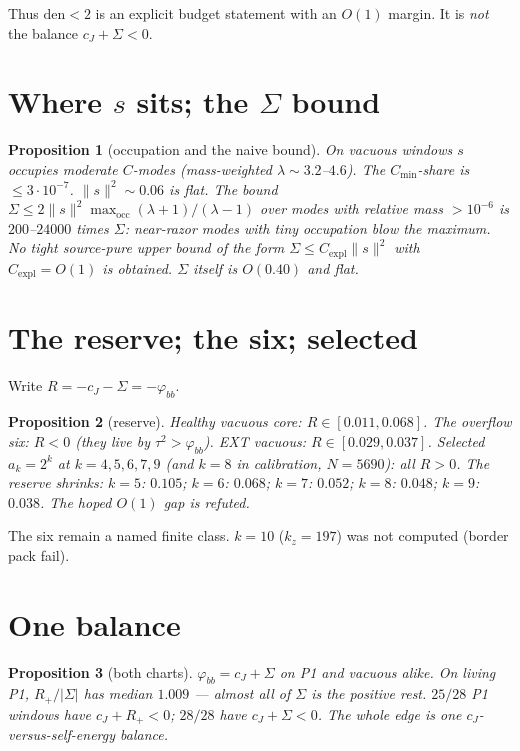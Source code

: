 \documentclass[11pt]{article}
\newtheorem{prop}{Proposition}
\theoremstyle{remark}
\newcommand{\phibb}{\varphi_{bb}}
\begin{document}
Thus $\mathrm{den}<2$ is an explicit budget statement
with an $O(1)$ margin.
It is \emph{not} the balance $c_J+\Sigma<0$.

\section{Where $s$ sits; the $\Sigma$ bound}\label{sec:sig}

\begin{prop}[occupation and the naive bound]\label{prop:sig}
On vacuous windows $s$ occupies moderate $C$-modes
(mass-weighted $\lambda\sim 3.2$--$4.6$).
The $C_{\min}$-share is $\le 3\cdot 10^{-7}$.
$\|s\|^{2}\sim 0.06$ is flat.
The bound
$\Sigma\le 2\|s\|^{2}\max_{\mathrm{occ}}(\lambda+1)/(\lambda-1)$
over modes with relative mass $>10^{-6}$ is
$200$--$24000$ times $\Sigma$: near-razor modes with
tiny occupation blow the maximum.
No tight source-pure upper bound of the form
$\Sigma\le C_{\mathrm{expl}}\|s\|^{2}$ with $C_{\mathrm{expl}}=O(1)$
is obtained.
$\Sigma$ itself is $O(0.40)$ and flat.
\end{prop}

\section{The reserve; the six; selected}\label{sec:res}

Write $R=-c_J-\Sigma=-\phibb$.

\begin{prop}[reserve]\label{prop:res}
Healthy vacuous core: $R\in[0.011,0.068]$.
The overflow six: $R<0$ (they live by $\tau^{2}>\phibb$).
EXT vacuous: $R\in[0.029,0.037]$.
Selected $a_k=2^k$ at $k=4,5,6,7,9$ (and $k=8$ in
calibration, $N=5690$): all $R>0$.
The reserve \emph{shrinks}:
$k=5$: $0.105$; $k=6$: $0.068$; $k=7$: $0.052$;
$k=8$: $0.048$; $k=9$: $0.038$.
The hoped $O(1)$ gap is refuted.
\end{prop}

The six remain a named finite class.
$k=10$ ($k_z=197$) was not computed (border pack fail).

\section{One balance}\label{sec:one}

\begin{prop}[both charts]\label{prop:one}
$\phibb=c_J+\Sigma$ on P1 and vacuous alike.
On living P1, $R_{+}/|\Sigma|$ has median $1.009$
--- almost all of $\Sigma$ is the positive rest.
$25/28$ P1 windows have $c_J+R_{+}<0$; $28/28$ have
$c_J+\Sigma<0$.
The whole edge is one $c_J$-versus-self-energy balance.
\end{prop}
\end{document}
